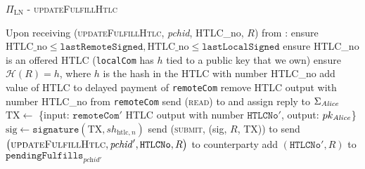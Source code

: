 \begin{protocolbox}{$\Pi_{\mathrm{LN}}$ - \textsc{updateFulfillHtlc}}
  \label{alg:protocol:pay:updateFulfillHtlc}
  \begin{algorithmic}[1]
    \State Upon receiving (\textsc{updateFulfillHtlc}, \textit{pchid}, HTLC\_no,
    $R$) from \bob:
    \Indent
      \State ensure $\mathrm{HTLC\_no} \leq \mathtt{lastRemoteSigned},
      \mathrm{HTLC\_no} \leq \mathtt{lastLocalSigned}$
      \State ensure HTLC\_no is an offered HTLC (\texttt{localCom} has $h$ tied
      to a public key that we own)
      \State ensure $\mathcal{H}\left(R\right) = h$, where $h$ is the hash in
      the HTLC with number HTLC\_no
      \State add value of HTLC to delayed payment of \texttt{remoteCom}
      \State remove HTLC output with number HTLC\_no from \texttt{remoteCom}
       
         
          \State send (\textsc{read}) to \ledger{} and assign reply to
          $\Sigma_{\mathit{Alice}}$
            \State $\mathrm{TX} \gets$ \{input: $\mathtt{remoteCom}'$ HTLC
            output with number $\mathtt{HTLCNo}'$, output: $pk_{\mathit{Alice}}$\}
            \State $\mathrm{sig} \gets \mathtt{signature}\left(\mathrm{TX},
            sh_{\mathrm{htlc}, n}\right)$
            \State send (\textsc{submit}, (sig, $R$, TX)) to \ledger{}
          \Else {}
            \State send $\left(\textsc{updateFulfillHtlc}, \mathit{pchid}',
            \mathtt{HTLCNo}, R\right)$ to counterparty
          \EndIf
        \Else {}
          \State add $\left(\mathtt{HTLCNo}', R\right)$ to
          $\mathtt{pendingFulfills}_{\textit{pchid}'}$
        \EndIf
      \EndIf
    \EndIndent
  \end{algorithmic}
\end{protocolbox}


